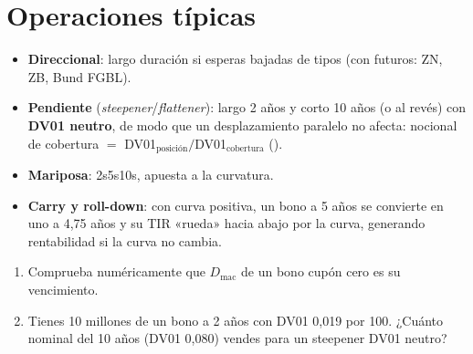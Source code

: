 \section{Operaciones típicas}
\begin{itemize}
\item \textbf{Direccional}: largo duración si esperas bajadas de tipos (con futuros: ZN, ZB, Bund FGBL).
\item \textbf{Pendiente} (\emph{steepener}/\emph{flattener}): largo 2 años y corto 10 años (o al revés) con
  \textbf{DV01 neutro}, de modo que un desplazamiento paralelo no afecta: nocional de cobertura
  $=$ DV01$_{\text{posición}}/$DV01$_{\text{cobertura}}$ ().
\item \textbf{Mariposa}: 2s5s10s, apuesta a la curvatura.
\item \textbf{Carry y roll-down}: con curva positiva, un bono a 5 años se convierte en uno a 4,75 años
  y su TIR «rueda» hacia abajo por la curva, generando rentabilidad si la curva no cambia.
\end{itemize}

\begin{ejercicios}
\begin{enumerate}
\item Comprueba numéricamente que $D_{\text{mac}}$ de un bono cupón cero es su vencimiento.
\item Tienes 10 millones de un bono a 2 años con DV01 0,019 por 100. ¿Cuánto nominal del 10 años
  (DV01 0,080) vendes para un steepener DV01 neutro?
\end{enumerate}
\end{ejercicios}
